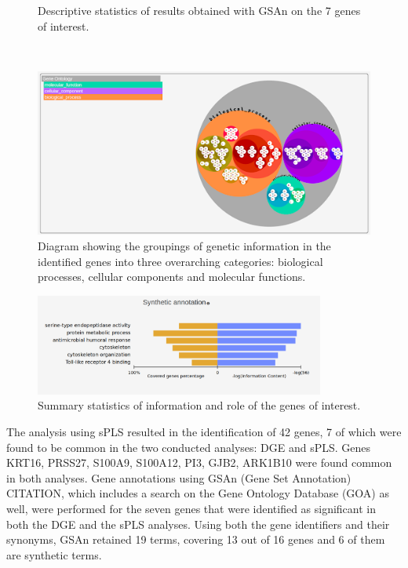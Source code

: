 \documentclass[journal, a4paper]{IEEEtran}
\begin{document}
\begin{figure}[!htp]
\begin{center}
\begin{minipage}{0.5 \textwidth}
      \caption{Descriptive statistics of results obtained with GSAn on the 7 genes of interest.}
      \label{fig:gsan-chart}
    \end{minipage}\\
    \begin{minipage}{0.5 \textwidth}
      \centering
      \includegraphics[width=\textwidth]{gene-ontology.png}
      \caption{Diagram showing the groupings of genetic information in the identified genes into three overarching categories: biological processes, cellular components and molecular functions.}
      \label{fig:gene-ontology}
    \end{minipage}
  \end{center}
\end{figure}

\begin{figure} %
  \centering
  \includegraphics[width=0.85\textwidth]{synthetic-annotation.png}
  \caption{Summary statistics of information and role of the genes of interest.}
  \label{fig:synthetic-annotation}
\end{figure}


The analysis using sPLS resulted in the identification of 42 genes, 7 of which were found to be common in the two conducted analyses: DGE and sPLS. Genes KRT16, PRSS27, S100A9, S100A12, PI3, GJB2, ARK1B10 were found common in both analyses. Gene annotations using GSAn (Gene Set Annotation) CITATION, which includes a search on the Gene Ontology Database (GOA) as well, were performed for the seven genes that were identified as significant in both the DGE and the sPLS analyses. Using both the gene identifiers and their synonyms, GSAn retained 19 terms, covering 13 out of 16 genes and 6 of them are synthetic terms.\\
\end{document}
